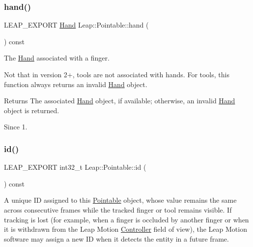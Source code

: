 \subsubsection{\texorpdfstring{hand()}{hand()}}
{\footnotesize\ttfamily L\+E\+A\+P\+\_\+\+E\+X\+P\+O\+RT \hyperlink{class_leap_1_1_hand}{Hand} Leap\+::\+Pointable\+::hand (\begin{DoxyParamCaption}{ }\end{DoxyParamCaption}) const}

The \hyperlink{class_leap_1_1_hand}{Hand} associated with a finger.


\begin{DoxyCodeInclude}
\end{DoxyCodeInclude}


Not that in version 2+, tools are not associated with hands. For tools, this function always returns an invalid \hyperlink{class_leap_1_1_hand}{Hand} object.

\begin{DoxyReturn}{Returns}
The associated \hyperlink{class_leap_1_1_hand}{Hand} object, if available; otherwise, an invalid \hyperlink{class_leap_1_1_hand}{Hand} object is returned. 
\end{DoxyReturn}
\begin{DoxySince}{Since}
1. 
\end{DoxySince}
\mbox{\label{class_leap_1_1_pointable_a4946a6fe0e478488a3d3ab3c3dbf390f}} 
\subsubsection{\texorpdfstring{id()}{id()}}
{\footnotesize\ttfamily L\+E\+A\+P\+\_\+\+E\+X\+P\+O\+RT int32\+\_\+t Leap\+::\+Pointable\+::id (\begin{DoxyParamCaption}{ }\end{DoxyParamCaption}) const}

A unique ID assigned to this \hyperlink{class_leap_1_1_pointable}{Pointable} object, whose value remains the same across consecutive frames while the tracked finger or tool remains visible. If tracking is lost (for example, when a finger is occluded by another finger or when it is withdrawn from the Leap Motion \hyperlink{class_leap_1_1_controller}{Controller} field of view), the Leap Motion software may assign a new ID when it detects the entity in a future frame.


